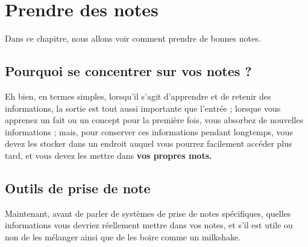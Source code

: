 \hypertarget{prendre-des-notes}{%
\section{Prendre des notes}\label{prendre-des-notes}}

Dans ce chapitre, nous allons voir comment prendre de bonnes notes.

\hypertarget{pourquoi-se-concentrer-sur-vos-notes}{%
\subsection{Pourquoi se concentrer sur vos notes
?}\label{pourquoi-se-concentrer-sur-vos-notes}}

Eh bien, en termes simples, lorsqu'il s'agit d'apprendre et de retenir
des informations, la sortie est tout aussi importante que l'entrée ;
lorsque vous apprenez un fait ou un concept pour la première fois, vous
absorbez de nouvelles informations ; mais, pour conserver ces
informations pendant longtemps, vous devez les stocker dans un endroit
auquel vous pourrez facilement accéder plus tard, et vous devez les
mettre dans \textbf{vos propres mots.}

\hypertarget{outils-de-prise-de-note}{%
\subsection{Outils de prise de note}\label{outils-de-prise-de-note}}

Maintenant, avant de parler de systèmes de prise de notes spécifiques,
quelles informations vous devriez réellement mettre dans vos notes, et
s'il est utile ou non de les mélanger ainsi que de les boire comme un
milkshake.

